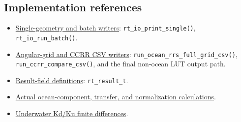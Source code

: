 \subsection{Implementation references}
\label{sec:auto:05_output_formats:10.1}
\begin{itemize}
\item \href{https://github.com/brtnt/OCRT/blob/54861c68e35ec5aaa3938fad53e93dc2dfa7eb1d/code/OCRT_C/src/rt_io.c}{Single-geometry and batch writers}: \texttt{rt\_\allowbreak{}io\_\allowbreak{}print\_\allowbreak{}single()}, \texttt{rt\_\allowbreak{}io\_\allowbreak{}run\_\allowbreak{}batch()}.
\item \href{https://github.com/brtnt/OCRT/blob/54861c68e35ec5aaa3938fad53e93dc2dfa7eb1d/code/OCRT_C/src/main.c}{Angular-grid and CCRR CSV writers}: \texttt{run\_\allowbreak{}ocean\_\allowbreak{}rrs\_\allowbreak{}full\_\allowbreak{}grid\_\allowbreak{}csv()}, \texttt{run\_\allowbreak{}ccrr\_\allowbreak{}compare\_\allowbreak{}csv()}, and the final non-ocean LUT output path.
\item \href{https://github.com/brtnt/OCRT/blob/54861c68e35ec5aaa3938fad53e93dc2dfa7eb1d/code/OCRT_C/src/rt_types.h}{Result-field definitions}: \texttt{rt\_\allowbreak{}result\_\allowbreak{}t}.
\item \href{https://github.com/brtnt/OCRT/blob/54861c68e35ec5aaa3938fad53e93dc2dfa7eb1d/code/OCRT_C/src/rt_solver.c}{Actual ocean-component, transfer, and normalization calculations}.
\item \href{https://github.com/brtnt/OCRT/blob/54861c68e35ec5aaa3938fad53e93dc2dfa7eb1d/code/OCRT_C/src/rt_water_rt.c}{Underwater Kd/Ku finite differences}.
\end{itemize}

